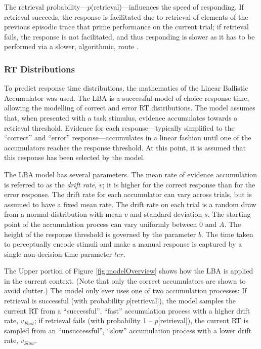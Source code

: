 \documentclass[a4paper, jou, natbib]{apa6}
\begin{document}
The retrieval probability---$p$(retrieval)---influences the speed of responding. If retrieval succeeds, the response is facilitated due to retrieval of elements of the previous episodic trace that prime performance on the current trial; if retrieval fails, the response is not facilitated, and thus responding is slower as it has to be performed via a slower, algorithmic, route \citep[see][for discussion]{Grange2015}.

\subsubsection{RT Distributions}
To predict response time distributions, the mathematics of the Linear Ballistic Accumulator \citep{Brown2008} was used. The LBA is a successful model of choice response time, allowing the modelling of correct and error RT distributions. The model assumes that, when presented with a task stimulus, evidence accumulates towards a retrieval threshold. Evidence for each response---typically simplified to the ``correct'' and ``error'' response---accumulates in a linear fashion until one of the accumulators reaches the response threshold. At this point, it is assumed that this response has been selected by the model. 

The LBA model has several parameters. The mean rate of evidence accumulation is referred to as the \emph{drift rate}, $v$; it is higher for the correct response than for the error response. The drift rate for each accumulator can vary across trials, but is assumed to have a fixed mean rate. The drift rate on each trial is a random draw from a normal distribution with mean $v$ and standard deviation $s$. The starting point of the accumulation process can vary uniformly between 0 and $A$. The height of the response threshold is governed by the parameter $b$. The time taken to perceptually encode stimuli and make a manual response is captured by a single non-decision time parameter $ter$. 

The Upper portion of Figure \ref{fig:modelOverview} shows how the LBA is applied in the current context. (Note that only the correct accumulators are shown to avoid clutter.) The model only ever uses one of two accumulation processes: If retrieval is successful (with probability $p$[retrieval]), the model samples the current RT from a ``successful'', ``fast'' accumulation process with a higher drift rate, $v_{Fast}$; if retrieval fails (with probability 1 -- $p$[retrieval]), the current RT is sampled from an ``unsuccessful'', ``slow'' accumulation process with a lower drift rate, $v_{Slow}$. 
\end{document}
